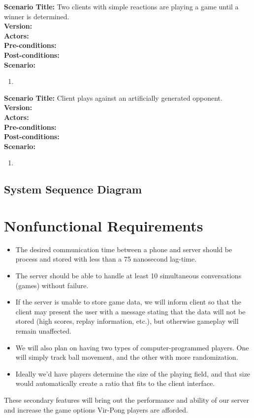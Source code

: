 \documentclass[letterpaper,12pt]{article}
\begin{document}
\noindent \textbf{Scenario Title:} Two clients with simple reactions are playing a game until a winner is determined. \\
\textbf{Version:}\\
\textbf{Actors:}\\
\textbf{Pre-conditions:}\\
\textbf{Post-conditions:}\\
\textbf{Scenario:}\\
\begin{enumerate}
\item
\end{enumerate}

\noindent \textbf{Scenario Title:} Client plays against an artificially generated opponent.\\
\textbf{Version:}\\
\textbf{Actors:}\\
\textbf{Pre-conditions:}\\
\textbf{Post-conditions:}\\
\textbf{Scenario:}\\
\begin{enumerate}
\item
\end{enumerate}


\subsection{System Sequence Diagram}
\section{Nonfunctional Requirements}
\begin{itemize}
\item The desired communication time between a phone and server should be process and stored with less than a 75 nanosecond lag-time.
\item The server should be able to handle at least 10 simultaneous conversations (games) without failure. 
\item If the server is unable to store game data, we will inform client so that the client may present the user with a message stating that the data will not be stored (high scores, replay information, etc.), but otherwise gameplay will remain unaffected. 
\item We will also plan on having two types of computer-programmed players. One will simply track ball movement, and the other with more randomization. 
\item Ideally we'd have players determine the size of the playing field, and that size would automatically create a ratio that fits to the client interface. 
\end{itemize}
These secondary features will bring out the performance and ability of our server and increase the game options Vir-Pong players are afforded. 
\end{document}
